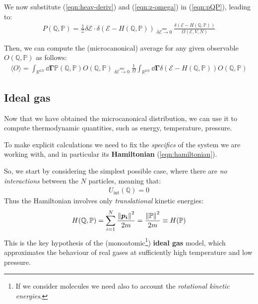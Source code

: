 \documentclass[../template.tex]{subfiles}
\begin{document}
We now substitute (\ref{eqn:heav-deriv}) and (\ref{eqn:z-omega}) in (\ref{eqn:pQP}), leading to:
\begin{align}\label{eqn:pQP1}
    P(\mathbb{Q}, \mathbb{P}) = \frac{1}{\mathcal{Z}} \delta \mathcal{E}\cdot \delta (\mathcal{E}- H(\mathbb{Q}, \mathbb{P})) \underset{\delta \mathcal{E} \to 0}{=} \frac{\delta(\mathcal{E}-H(\mathbb{Q}, \mathbb{P}))}{\Omega(\mathcal{E}, V, N)} 
\end{align}

Then, we can compute the (microcanonical) average for any given observable $O(\mathbb{Q},\mathbb{P})$ as follows:
\begin{align*}
    \langle O \rangle = \int_{\mathbb{R}^{6N}} \dd{\bm{\Gamma}} \mathbb{P}(\mathbb{Q}, \mathbb{P}) O(\mathbb{Q}, \mathbb{P}) \underset{\delta \mathcal{E} \to 0}{=} \frac{1}{\Omega} \int_{\mathbb{R}^{6N}} \dd{\bm{\Gamma}} \delta(\mathcal{E}- H(\mathbb{Q},\mathbb{P})) O(\mathbb{Q},\mathbb{P})
\end{align*}

\subsection{Ideal gas}
Now that we have obtained the microcanonical distribution, we can use it to compute thermodynamic quantities, such as energy, temperature, pressure.

\medskip

To make explicit calculations we need to fix the \textit{specifics} of the system we are working with, and in particular its \textbf{Hamiltonian} (\ref{eqn:hamiltonian}). 

So, we start by considering the simplest possible case, where there are \textit{no interactions} between the $N$ particles, meaning that:
\begin{align} \label{eqn:no-interaction}
    U_{\mathrm{int}}(\mathbb{Q}) = 0
\end{align} 
Thus the Hamiltonian involves only \textit{translational} kinetic energies:
\begin{align}\label{eqn:h-ideal-gas}
    H(\mathbb{Q},\mathbb{P}) = \sum_{i=1}^N \frac{\norm{\bm{p_i}}^2}{2m} = \frac{\norm{\mathbb{P}}^2}{2m} \equiv H(\mathbb{P})
\end{align}
This is the key hypothesis of the (monoatomic\footnote{If we consider molecules we need also to account the \textit{rotational kinetic energies}.}) \textbf{ideal gas} model, which approximates the behaviour of real gases at sufficiently high temperature and low pressure.
\end{document}
